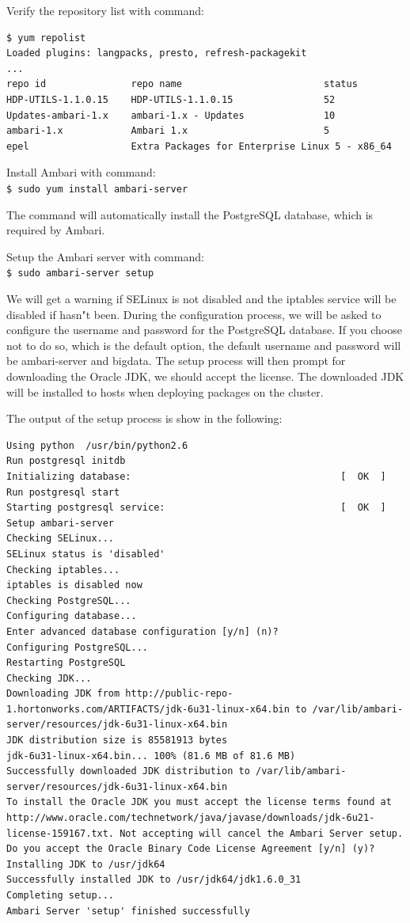 Verify the repository list with command: 
\begin{verbatim}
$ yum repolist
Loaded plugins: langpacks, presto, refresh-packagekit
...
repo id               repo name                         status
HDP-UTILS-1.1.0.15    HDP-UTILS-1.1.0.15                52
Updates-ambari-1.x    ambari-1.x - Updates              10
ambari-1.x            Ambari 1.x                        5
epel                  Extra Packages for Enterprise Linux 5 - x86_64
\end{verbatim}

Install Ambari with command: \\
\verb|$ sudo yum install ambari-server|

The command will automatically install the PostgreSQL database, which is required by Ambari.

Setup the Ambari server with command: \\
\verb|$ sudo ambari-server setup|

We will get a warning if SELinux is not disabled and the iptables service will be disabled if hasn"t been. During the configuration process, we will be asked to configure the username and password for the PostgreSQL database. If you choose not to do so, which is the default option, the default username and password will be ambari-server and bigdata. The setup process will then prompt for downloading the Oracle JDK, we should accept the license. The downloaded JDK will be installed to hosts when deploying packages on the cluster.

The output of the setup process is show in the following:
\begin{verbatim}
Using python  /usr/bin/python2.6
Run postgresql initdb
Initializing database:                                     [  OK  ]
Run postgresql start
Starting postgresql service:                               [  OK  ]
Setup ambari-server
Checking SELinux...
SELinux status is 'disabled'
Checking iptables...
iptables is disabled now
Checking PostgreSQL...
Configuring database...
Enter advanced database configuration [y/n] (n)?
Configuring PostgreSQL...
Restarting PostgreSQL
Checking JDK...
Downloading JDK from http://public-repo-1.hortonworks.com/ARTIFACTS/jdk-6u31-linux-x64.bin to /var/lib/ambari-server/resources/jdk-6u31-linux-x64.bin
JDK distribution size is 85581913 bytes
jdk-6u31-linux-x64.bin... 100% (81.6 MB of 81.6 MB)
Successfully downloaded JDK distribution to /var/lib/ambari-server/resources/jdk-6u31-linux-x64.bin
To install the Oracle JDK you must accept the license terms found at http://www.oracle.com/technetwork/java/javase/downloads/jdk-6u21-license-159167.txt. Not accepting will cancel the Ambari Server setup.
Do you accept the Oracle Binary Code License Agreement [y/n] (y)?
Installing JDK to /usr/jdk64
Successfully installed JDK to /usr/jdk64/jdk1.6.0_31
Completing setup...
Ambari Server 'setup' finished successfully
\end{verbatim}

